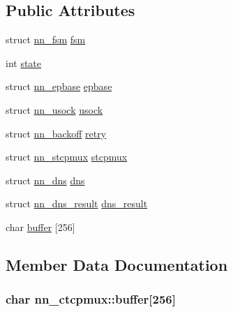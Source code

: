 \subsection*{Public Attributes}
\begin{DoxyCompactItemize}
\item 
struct \hyperlink{structnn__fsm}{nn\+\_\+fsm} \hyperlink{structnn__ctcpmux_a5e3c1c136cd2b28b585b7311dc61c795}{fsm}
\item 
int \hyperlink{structnn__ctcpmux_ab0103503ff213fe896f4d45ceea723ca}{state}
\item 
struct \hyperlink{structnn__epbase}{nn\+\_\+epbase} \hyperlink{structnn__ctcpmux_a5979503ad3f681f42da267bcceda7545}{epbase}
\item 
struct \hyperlink{structnn__usock}{nn\+\_\+usock} \hyperlink{structnn__ctcpmux_ae5c270ad3b4d7e376ed0d4a0f876e4ad}{usock}
\item 
struct \hyperlink{structnn__backoff}{nn\+\_\+backoff} \hyperlink{structnn__ctcpmux_a8c52683d34482048bedc8b3a60c9f901}{retry}
\item 
struct \hyperlink{structnn__stcpmux}{nn\+\_\+stcpmux} \hyperlink{structnn__ctcpmux_a53e694d9e610eb735da294988afc48e2}{stcpmux}
\item 
struct \hyperlink{structnn__dns}{nn\+\_\+dns} \hyperlink{structnn__ctcpmux_af6ee113d28282fd32301914547a26aae}{dns}
\item 
struct \hyperlink{structnn__dns__result}{nn\+\_\+dns\+\_\+result} \hyperlink{structnn__ctcpmux_a1f0c2bf52607b4504f10598bf1cbcf62}{dns\+\_\+result}
\item 
char \hyperlink{structnn__ctcpmux_a2dcc2919792d09641f8f8ff6f69d0f16}{buffer} \mbox{[}256\mbox{]}
\end{DoxyCompactItemize}


\subsection{Member Data Documentation}
\subsubsection[{buffer}]{\setlength{\rightskip}{0pt plus 5cm}char nn\+\_\+ctcpmux\+::buffer\mbox{[}256\mbox{]}}\hypertarget{structnn__ctcpmux_a2dcc2919792d09641f8f8ff6f69d0f16}{}\label{structnn__ctcpmux_a2dcc2919792d09641f8f8ff6f69d0f16}
